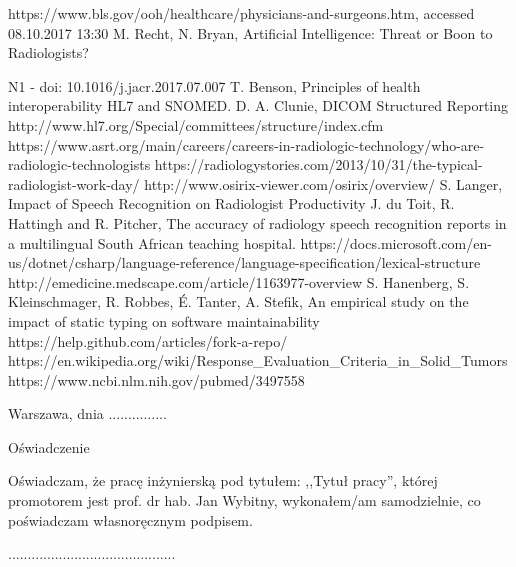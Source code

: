 \documentclass[12pt, twoside, openany]{report}
\theoremstyle{definition}
\begin{document}
\begin{thebibliography}{11}
 https://www.bls.gov/ooh/healthcare/physicians-and-surgeons.htm, accessed 08.10.2017 13:30
 M. Recht, N. Bryan, Artificial Intelligence: Threat or Boon to Radiologists?

N1  - doi: 10.1016/j.jacr.2017.07.007
 T. Benson, Principles of health interoperability HL7 and SNOMED.
 D. A. Clunie, DICOM Structured Reporting
 http://www.hl7.org/Special/committees/structure/index.cfm 
 https://www.asrt.org/main/careers/careers-in-radiologic-technology/who-are-radiologic-technologists
 https://radiologystories.com/2013/10/31/the-typical-radiologist-work-day/
http://www.osirix-viewer.com/osirix/overview/
S. Langer, Impact of Speech Recognition on Radiologist Productivity
 J. du Toit, R. Hattingh and R. Pitcher, The accuracy of radiology speech recognition
reports in a multilingual South African teaching hospital.
https://docs.microsoft.com/en-us/dotnet/csharp/language-reference/language-specification/lexical-structure
 http://emedicine.medscape.com/article/1163977-overview
    S. Hanenberg, S. Kleinschmager, R. Robbes, É. Tanter, A. Stefik, An empirical study on the impact of static typing on software maintainability
 https://help.github.com/articles/fork-a-repo/
https://en.wikipedia.org/wiki/Response\_Evaluation\_Criteria\_in\_Solid\_Tumors
 https://www.ncbi.nlm.nih.gov/pubmed/3497558
\end{thebibliography}
\clearpage
\begin{otherlanguage}{polish}
\pagestyle{empty}
\noindent Warszawa, dnia ...............
\vspace{5cm}
\begin{center}
\LARGE{Oświadczenie}
\end{center}
Oświadczam, że pracę inżynierską pod tytułem: ,,Tytuł pracy'', której promotorem jest prof. dr hab. Jan Wybitny, wykonałem/am samodzielnie, co poświadczam własnoręcznym podpisem.
\vspace{2cm}
\begin{flushright}
...........................................
\end{flushright}
\end{otherlanguage}
\end{document}
